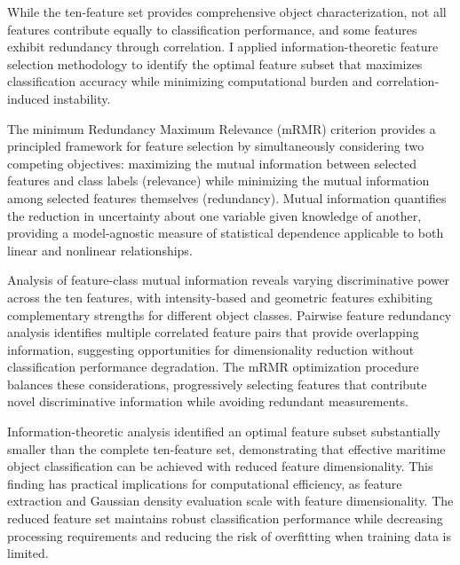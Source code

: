 \documentclass{erauthesis}
\begin{document}

While the ten-feature set provides comprehensive object characterization, not all features contribute equally to classification performance, and some features exhibit redundancy through correlation.
I applied information-theoretic feature selection methodology to identify the optimal feature subset that maximizes classification accuracy while minimizing computational burden and correlation-induced instability.

The minimum Redundancy Maximum Relevance (mRMR) criterion provides a principled framework for feature selection by simultaneously considering two competing objectives: maximizing the mutual information between selected features and class labels (relevance) while minimizing the mutual information among selected features themselves (redundancy).
Mutual information quantifies the reduction in uncertainty about one variable given knowledge of another, providing a model-agnostic measure of statistical dependence applicable to both linear and nonlinear relationships.

Analysis of feature-class mutual information reveals varying discriminative power across the ten features, with intensity-based and geometric features exhibiting complementary strengths for different object classes.
Pairwise feature redundancy analysis identifies multiple correlated feature pairs that provide overlapping information, suggesting opportunities for dimensionality reduction without classification performance degradation.
The mRMR optimization procedure balances these considerations, progressively selecting features that contribute novel discriminative information while avoiding redundant measurements.

Information-theoretic analysis identified an optimal feature subset substantially smaller than the complete ten-feature set, demonstrating that effective maritime object classification can be achieved with reduced feature dimensionality.
This finding has practical implications for computational efficiency, as feature extraction and Gaussian density evaluation scale with feature dimensionality.
The reduced feature set maintains robust classification performance while decreasing processing requirements and reducing the risk of overfitting when training data is limited.
\end{document}

